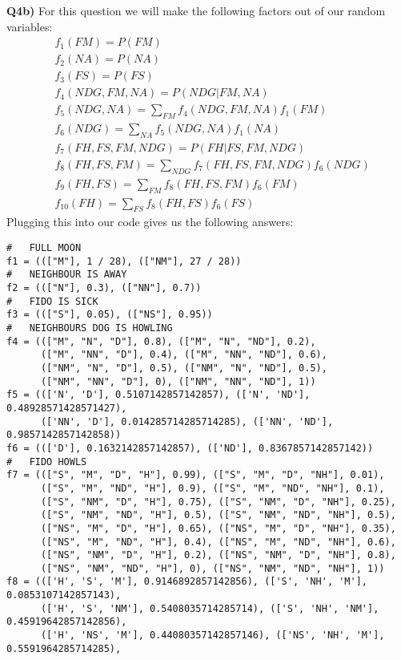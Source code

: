 \documentclass{article}
\begin{document}
\begin{titlepage}
\begin{center}
\begin{tikzpicture}[
  node distance=1cm and 0cm,
  mynode/.style={draw,ellipse,text width=2cm,align=center}
]
\end{tikzpicture}
\end{center}
\textbf{Q4b)} For this question we will make the following factors out of our random variables:
\begin{align*}
& f_1(FM) = P(FM) \\ 
& f_2(NA) = P(NA) \\
& f_3(FS) = P(FS) \\
& f_4(NDG, FM, NA) = P(NDG | FM, NA) \\
& f_5(NDG, NA) = \sum_{FM} f_4(NDG, FM, NA)f_1(FM)  \\
& f_6(NDG) = \sum_{NA} f_5(NDG, NA)f_1(NA) \\
& f_7(FH, FS, FM, NDG) = P(FH | FS, FM, NDG) \\
& f_8(FH, FS, FM) = \sum_{NDG} f_7(FH, FS, FM, NDG)f_6(NDG)  \\
& f_9(FH, FS) = \sum_{FM} f_8(FH, FS, FM)f_6(FM) \\
& f_{10}(FH) = \sum_{FS} f_8(FH, FS)f_6(FS)
\end{align*}
Plugging this into our code gives us the following answers:
\begin{lstlisting}
#   FULL MOON
f1 = ((["M"], 1 / 28), (["NM"], 27 / 28))
#   NEIGHBOUR IS AWAY
f2 = ((["N"], 0.3), (["NN"], 0.7))
#   FIDO IS SICK
f3 = ((["S"], 0.05), (["NS"], 0.95))
#   NEIGHBOURS DOG IS HOWLING
f4 = ((["M", "N", "D"], 0.8), (["M", "N", "ND"], 0.2),
      (["M", "NN", "D"], 0.4), (["M", "NN", "ND"], 0.6),
      (["NM", "N", "D"], 0.5), (["NM", "N", "ND"], 0.5),
      (["NM", "NN", "D"], 0), (["NM", "NN", "ND"], 1)) 
f5 = ((['N', 'D'], 0.5107142857142857), (['N', 'ND'], 0.48928571428571427),
      (['NN', 'D'], 0.014285714285714285), (['NN', 'ND'], 0.9857142857142858))
f6 = ((['D'], 0.1632142857142857), (['ND'], 0.8367857142857142))
#   FIDO HOWLS
f7 = ((["S", "M", "D", "H"], 0.99), (["S", "M", "D", "NH"], 0.01),
      (["S", "M", "ND", "H"], 0.9), (["S", "M", "ND", "NH"], 0.1),
      (["S", "NM", "D", "H"], 0.75), (["S", "NM", "D", "NH"], 0.25),
      (["S", "NM", "ND", "H"], 0.5), (["S", "NM", "ND", "NH"], 0.5),
      (["NS", "M", "D", "H"], 0.65), (["NS", "M", "D", "NH"], 0.35),
      (["NS", "M", "ND", "H"], 0.4), (["NS", "M", "ND", "NH"], 0.6),
      (["NS", "NM", "D", "H"], 0.2), (["NS", "NM", "D", "NH"], 0.8),
      (["NS", "NM", "ND", "H"], 0), (["NS", "NM", "ND", "NH"], 1))
f8 = ((['H', 'S', 'M'], 0.9146892857142856), (['S', 'NH', 'M'], 0.0853107142857143),
      (['H', 'S', 'NM'], 0.5408035714285714), (['S', 'NH', 'NM'], 0.45919642857142856),
      (['H', 'NS', 'M'], 0.44080357142857146), (['NS', 'NH', 'M'], 0.5591964285714285),

\end{lstlisting}
\end{titlepage}
\end{document}
